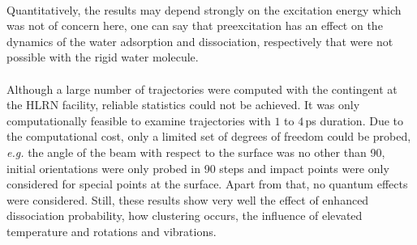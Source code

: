 \documentclass[11pt,DIV=13,BCOR=5mm,a4paper,headinclude]{scrbook}
\begin{document}
\\
Quantitatively, the results may depend strongly on the excitation energy which was not of concern here, one can say that preexcitation has an effect on the dynamics of the water adsorption and dissociation, respectively that were not possible with the rigid water molecule.
\\
\\
Although a large number of trajectories were computed with the contingent at the HLRN facility, reliable statistics could not be achieved.
It was only computationally feasible to examine trajectories with $1$ to $4\,$ps duration.
Due to the computational cost, only a limited set of degrees of freedom could be probed, \textit{e.g.} the angle of the beam with respect to the surface was no other than 90\textdegree{}, initial orientations were only probed in 90\textdegree{} steps and impact points were only considered for special points at the surface.
Apart from that, no quantum effects were considered.
Still, these results show very well the effect of enhanced dissociation probability, how clustering occurs, the influence of elevated temperature and rotations and vibrations\cite{Heiden0001_2018}.
\clearpage

\end{document}
